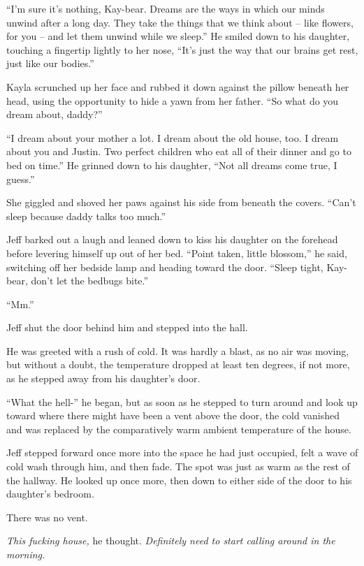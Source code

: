 ``I'm sure it's nothing, Kay-bear.  Dreams are the ways in which our minds unwind after a long day.  They take the things that we think about -- like flowers, for you -- and let them unwind while we sleep.''  He smiled down to his daughter, touching a fingertip lightly to her nose, ``It's just the way that our brains get rest, just like our bodies.''

Kayla scrunched up her face and rubbed it down against the pillow beneath her head, using the opportunity to hide a yawn from her father.  ``So what do you dream about, daddy?''

``I dream about your mother a lot.  I dream about the old house, too.  I dream about you and Justin.  Two perfect children who eat all of their dinner and go to bed on time.''  He grinned down to his daughter, ``Not all dreams come true, I guess.''

She giggled and shoved her paws against his side from beneath the covers.  ``Can't sleep because daddy talks too much.''

Jeff barked out a laugh and leaned down to kiss his daughter on the forehead before levering himself up out of her bed.  ``Point taken, little blossom,'' he said, switching off her bedside lamp and heading toward the door.  ``Sleep tight, Kay-bear, don't let the bedbugs bite.''

``Mm.''

Jeff shut the door behind him and stepped into the hall.

He was greeted with a rush of cold.  It was hardly a blast, as no air was moving, but without a doubt, the temperature dropped at least ten degrees, if not more, as he stepped away from his daughter's door.

``What the hell-'' he began, but as soon as he stepped to turn around and look up toward where there might have been a vent above the door, the cold vanished and was replaced by the comparatively warm ambient temperature of the house.

Jeff stepped forward once more into the space he had just occupied, felt a wave of cold wash through him, and then fade.  The spot was just as warm as the rest of the hallway.  He looked up once more, then down to either side of the door to his daughter's bedroom.

There was no vent.

\textit{This fucking house,} he thought.  \textit{Definitely need to start calling around in the morning.}
